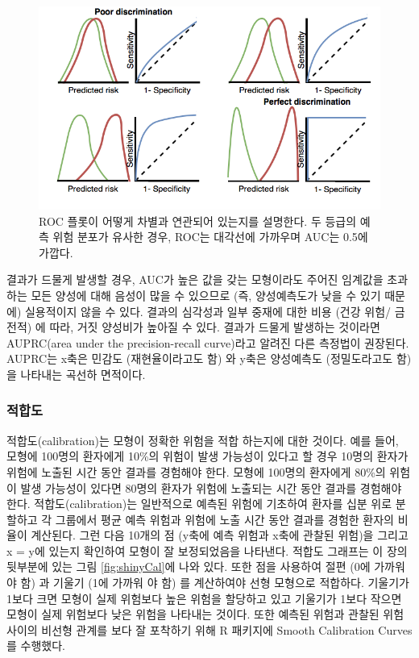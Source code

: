 \documentclass[11pt]{book}
\theoremstyle{definition}
\theoremstyle{definition}
\theoremstyle{definition}
\theoremstyle{remark}
\begin{document}
\begin{figure}
\includegraphics[width=1\linewidth]{images/PatientLevelPrediction/theory/roctheory} \caption{ROC 플롯이 어떻게 차별과 연관되어 있는지를 설명한다. 두 등급의 예측 위험 분포가 유사한 경우, ROC는 대각선에 가까우며 AUC는 0.5에 가깝다.}\label{fig:figuretheoryroctheory}
\end{figure}

결과가 드물게 발생할 경우, AUC가 높은 값을 갖는 모형이라도 주어진
임계값을 초과하는 모든 양성에 대해 음성이 많을 수 있으므로 (즉,
양성예측도가 낮을 수 있기 때문에) 실용적이지 않을 수 있다. 결과의
심각성과 일부 중재에 대한 비용 (건강 위험/ 금전적) 에 따라, 거짓
양성비가 높아질 수 있다. 결과가 드물게 발생하는 것이라면 AUPRC(area
under the precision-recall curve)라고 알려진 다른 측정법이 권장된다.
AUPRC는 x축은 민감도 (재현율이라고도 함) 와 y축은 양성예측도
(정밀도라고도 함) 을 나타내는 곡선하 면적이다.

\subsubsection*{적합도}

적합도(calibration)는 모형이 정확한 위험을 적합 하는지에 대한 것이다.
예를 들어, 모형에 100명의 환자에게 10\%의 위험이 발생 가능성이 있다고 할
경우 10명의 환자가 위험에 노출된 시간 동안 결과를 경험해야 한다. 모형에
100명의 환자에게 80\%의 위험이 발생 가능성이 있다면 80명의 환자가 위험에
노출되는 시간 동안 결과를 경험해야 한다. 적합도(calibration)는
일반적으로 예측된 위험에 기초하여 환자를 십분 위로 분할하고 각 그룹에서
평균 예측 위험과 위험에 노출 시간 동안 결과를 경험한 환자의 비율이
계산된다. 그런 다음 10개의 점 (y축에 예측 위험과 x축에 관찰된 위험)을
그리고 x = y에 있는지 확인하여 모형이 잘 보정되었음을 나타낸다. 적합도
그래프는 이 장의 뒷부분에 있는 그림 \ref{fig:shinyCal}에 나와 있다. 또한
점을 사용하여 절편 (0에 가까워 야 함) 과 기울기 (1에 가까워 야 함) 를
계산하여야 선형 모형으로 적합하다. 기울기가 1보다 크면 모형이 실제
위험보다 높은 위험을 할당하고 있고 기울기가 1보다 작으면 모형이 실제
위험보다 낮은 위험을 나타내는 것이다. 또한 예측된 위험과 관찰된 위험
사이의 비선형 관계를 보다 잘 포착하기 위해 R 패키지에 Smooth Calibration
Curves를 수행했다. 
\end{document}
